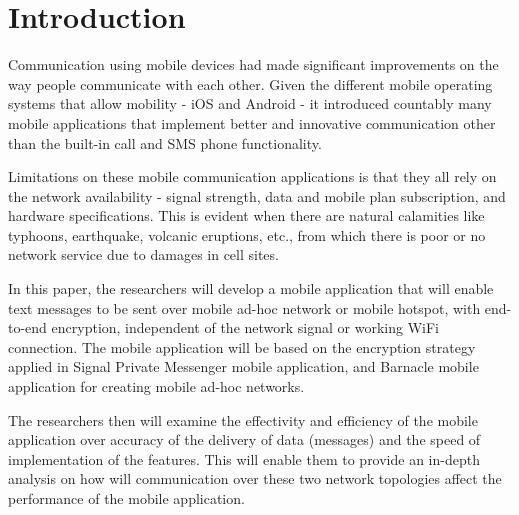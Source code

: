\section{Introduction}
Communication using mobile devices had made significant improvements on the way people communicate with each other. Given the different mobile operating systems that allow mobility - iOS and Android - it introduced countably many mobile applications that implement better and innovative communication other than the built-in call and SMS phone functionality.

Limitations on these mobile communication applications is that they all rely on the network availability - signal strength, data and mobile plan subscription, and hardware specifications. This is evident when there are natural calamities like typhoons, earthquake, volcanic eruptions, etc., from which there is poor or no network service due to damages in cell sites.

In this paper, the researchers will develop a mobile application that will enable text messages to be sent over mobile ad-hoc network or mobile hotspot, with end-to-end encryption, independent of the network signal or working WiFi connection. The mobile application will be based on the encryption strategy applied in Signal Private Messenger mobile application, and Barnacle mobile application for creating mobile ad-hoc networks.

The researchers then will examine the effectivity and efficiency of the mobile application over accuracy of the delivery of data (messages) and the speed of implementation of the features. This will enable them to provide an in-depth analysis on how will communication over these two network topologies affect the performance of the mobile application.


